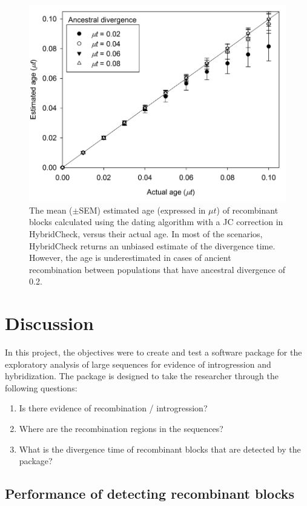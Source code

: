 \begin{figure}
	\includegraphics{Figures/HybridCheck/HC_Age}
    \caption{\label{fig:HC_Age}The mean ($\pm$SEM) estimated age (expressed in $\mu t$) of recombinant blocks calculated using the dating algorithm with a JC correction in HybridCheck, versus their actual age. In most of the scenarios, HybridCheck returns an unbiased estimate of the divergence time. However, the age is underestimated in cases of ancient recombination between populations that have ancestral divergence of 0.2.}
\end{figure}


\section{Discussion}
In this project, the objectives were to create and test a software package for the exploratory analysis of large sequences for evidence of introgression and hybridization. The package is designed to take the researcher through the following questions:

\begin{enumerate}
	\item Is there evidence of recombination / introgression?
    \item Where are the recombination regions in the sequences?
    \item What is the divergence time of recombinant blocks that are detected by the package?
\end{enumerate}

\subsection{Performance of detecting recombinant blocks}

